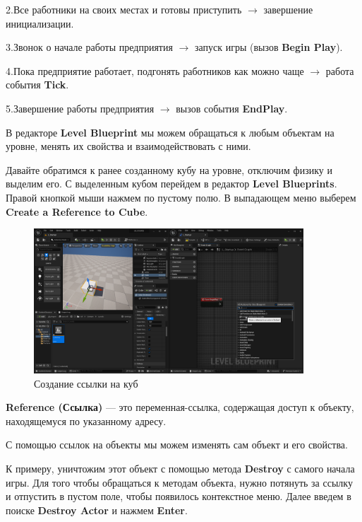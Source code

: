 2.\hspace{1em}Все работники на своих местах и готовы приступить $\rightarrow$ завершение инициализации.

3.\hspace{1em}Звонок о начале работы предприятия $\rightarrow$ запуск игры (вызов \textbf{Begin Play}).

4.\hspace{1em}Пока предприятие работает, подгонять работников как можно чаще $\rightarrow$ работа события \textbf{Tick}.

5.\hspace{1em}Завершение работы предприятия $\rightarrow$ вызов события \textbf{EndPlay}.

В редакторе \textbf{Level Blueprint} мы можем обращаться к любым объектам на уровне, менять их свойства и взаимодействовать с ними.

Давайте обратимся к ранее созданному кубу на уровне, отключим физику и выделим его. С выделенным кубом перейдем в редактор \textbf{Level Blueprints}. Правой кнопкой мыши нажмем по пустому полю. В выпадающем меню выберем \textbf{Create a Reference to Cube}.

\begin{figure}[h]
    \centering
    \includegraphics[width=0.9\textwidth]{Lections/CreateReferenceToCube.png}
    \caption{Создание ссылки на куб}
\end{figure}

\textbf{Reference (Ссылка)} — это переменная-ссылка, содержащая доступ к объекту, находящемуся по указанному адресу.

С помощью ссылок на объекты мы можем изменять сам объект и его свойства.

К примеру, уничтожим этот объект с помощью метода \textbf{Destroy} с самого начала игры. Для того чтобы обращаться к методам объекта, нужно потянуть за ссылку и отпустить в пустом поле, чтобы появилось контекстное меню. Далее введем в поиске \textbf{Destroy Actor} и нажмем \textbf{Enter}.

